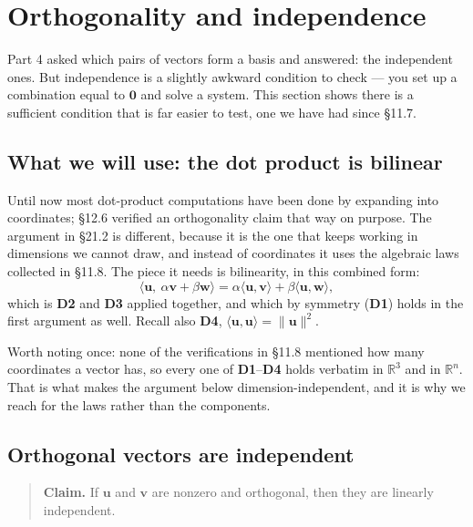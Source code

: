 \documentclass[11pt]{article}
\theoremstyle{definition}
\theoremstyle{remark}
\newcommand{\R}{\mathbb{R}}
\newcommand{\vc}[1]{\mathbf{#1}}
\newcommand{\norm}[1]{\lVert #1\rVert}
\begin{document}
\section{Orthogonality and independence}
Part 4 asked which pairs of vectors form a basis and answered: the independent
ones. But independence is a slightly awkward condition to check --- you set up a
combination equal to $\vc{0}$ and solve a system. This section shows there is a
sufficient condition that is far easier to test, one we have had since \S11.7.

\subsection{What we will use: the dot product is bilinear}
Until now most dot-product computations have been done by expanding into
coordinates; \S12.6 verified an orthogonality claim that way on purpose. The
argument in \S21.2 is different, because it is the one that keeps working in
dimensions we cannot draw, and instead of coordinates it uses the algebraic laws
collected in \S11.8. The piece it needs is bilinearity, in this combined form:
\[
  \bigl\langle \vc{u},\ \alpha\vc{v}+\beta\vc{w}\bigr\rangle
  = \alpha\langle\vc{u},\vc{v}\rangle + \beta\langle\vc{u},\vc{w}\rangle ,
\]
which is \textbf{D2} and \textbf{D3} applied together, and which by symmetry
(\textbf{D1}) holds in the first argument as well. Recall also \textbf{D4},
$\langle\vc{u},\vc{u}\rangle=\norm{\vc{u}}^{2}$.

Worth noting once: none of the verifications in \S11.8 mentioned how many
coordinates a vector has, so every one of \textbf{D1}--\textbf{D4} holds verbatim
in $\R^{3}$ and in $\R^{n}$. That is what makes the argument below
dimension-independent, and it is why we reach for the laws rather than the
components.

\subsection{Orthogonal vectors are independent}
\begin{quote}
\textbf{Claim.} If $\vc{u}$ and $\vc{v}$ are nonzero and orthogonal, then they
are linearly independent.
\end{quote}
\end{document}

